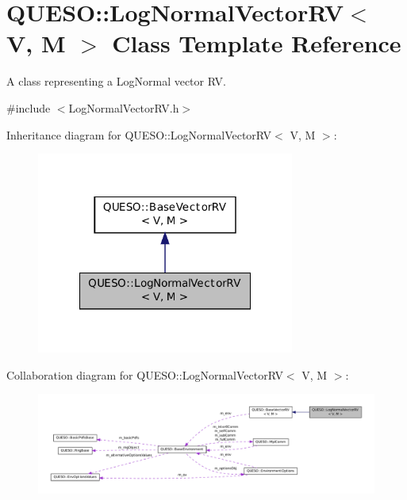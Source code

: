 \hypertarget{class_q_u_e_s_o_1_1_log_normal_vector_r_v}{\section{Q\-U\-E\-S\-O\-:\-:Log\-Normal\-Vector\-R\-V$<$ V, M $>$ Class Template Reference}
\label{class_q_u_e_s_o_1_1_log_normal_vector_r_v}
}


A class representing a Log\-Normal vector R\-V.  




{\ttfamily \#include $<$Log\-Normal\-Vector\-R\-V.\-h$>$}



Inheritance diagram for Q\-U\-E\-S\-O\-:\-:Log\-Normal\-Vector\-R\-V$<$ V, M $>$\-:
\nopagebreak
\begin{figure}[H]
\begin{center}
\leavevmode
\includegraphics[width=240pt]{class_q_u_e_s_o_1_1_log_normal_vector_r_v__inherit__graph}
\end{center}
\end{figure}


Collaboration diagram for Q\-U\-E\-S\-O\-:\-:Log\-Normal\-Vector\-R\-V$<$ V, M $>$\-:
\nopagebreak
\begin{figure}[H]
\begin{center}
\leavevmode
\includegraphics[width=350pt]{class_q_u_e_s_o_1_1_log_normal_vector_r_v__coll__graph}
\end{center}
\end{figure}
